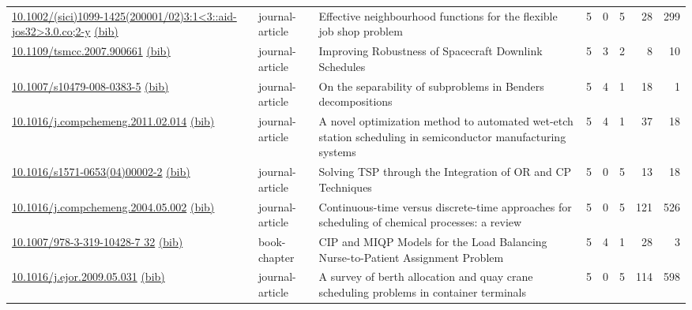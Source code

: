 {\begin{longtable}{p{5cm}lp{11cm}rrrrr}
\href{http://dx.doi.org/10.1002/(sici)1099-1425(200001/02)3:1<3::aid-jos32>3.0.co;2-y}{10.1002/(sici)1099-1425(200001/02)3:1<3::aid-jos32>3.0.co;2-y} \href{https://www.doi2bib.org/bib/10.1002/(sici)1099-1425(200001/02)3:1<3::aid-jos32>3.0.co;2-y}{(bib)} & journal-article & Effective neighbourhood functions for the flexible job shop problem & 5 & 0 & 5 & 28 & 299 \\
\href{http://dx.doi.org/10.1109/tsmcc.2007.900661}{10.1109/tsmcc.2007.900661} \href{https://www.doi2bib.org/bib/10.1109/tsmcc.2007.900661}{(bib)} & journal-article & Improving Robustness of Spacecraft Downlink Schedules & 5 & 3 & 2 & 8 & 10 \\
\href{http://dx.doi.org/10.1007/s10479-008-0383-5}{10.1007/s10479-008-0383-5} \href{https://www.doi2bib.org/bib/10.1007/s10479-008-0383-5}{(bib)} & journal-article & On the separability of subproblems in Benders decompositions & 5 & 4 & 1 & 18 & 1 \\
\href{http://dx.doi.org/10.1016/j.compchemeng.2011.02.014}{10.1016/j.compchemeng.2011.02.014} \href{https://www.doi2bib.org/bib/10.1016/j.compchemeng.2011.02.014}{(bib)} & journal-article & A novel optimization method to automated wet-etch station scheduling in semiconductor manufacturing systems & 5 & 4 & 1 & 37 & 18 \\
\href{http://dx.doi.org/10.1016/s1571-0653(04)00002-2}{10.1016/s1571-0653(04)00002-2} \href{https://www.doi2bib.org/bib/10.1016/s1571-0653(04)00002-2}{(bib)} & journal-article & Solving TSP through the Integration of OR and CP Techniques & 5 & 0 & 5 & 13 & 18 \\
\href{http://dx.doi.org/10.1016/j.compchemeng.2004.05.002}{10.1016/j.compchemeng.2004.05.002} \href{https://www.doi2bib.org/bib/10.1016/j.compchemeng.2004.05.002}{(bib)} & journal-article & Continuous-time versus discrete-time approaches for scheduling of chemical processes: a review & 5 & 0 & 5 & 121 & 526 \\
\href{http://dx.doi.org/10.1007/978-3-319-10428-7_32}{10.1007/978-3-319-10428-7 32} \href{https://www.doi2bib.org/bib/10.1007/978-3-319-10428-7_32}{(bib)} & book-chapter & CIP and MIQP Models for the Load Balancing Nurse-to-Patient Assignment Problem & 5 & 4 & 1 & 28 & 3 \\
\href{http://dx.doi.org/10.1016/j.ejor.2009.05.031}{10.1016/j.ejor.2009.05.031} \href{https://www.doi2bib.org/bib/10.1016/j.ejor.2009.05.031}{(bib)} & journal-article & A survey of berth allocation and quay crane scheduling problems in container terminals & 5 & 0 & 5 & 114 & 598 \\

\end{longtable}}
